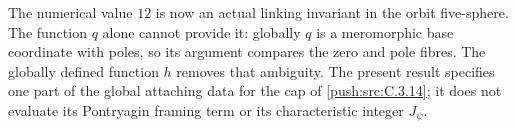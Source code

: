 \begin{remark}[Scope]
The numerical value $12$ is now an actual linking invariant in the
orbit five-sphere. The function $q$ alone cannot provide it: globally
$q$ is a meromorphic base coordinate with poles, so its argument
compares the zero and pole fibres. The globally defined function $h$
removes that ambiguity. The present result specifies one part of the
global attaching data for the cap of \ref{push:src:C.3.14}; it does not evaluate its
Pontryagin framing term or its characteristic integer $J_\psi$.
\end{remark}
